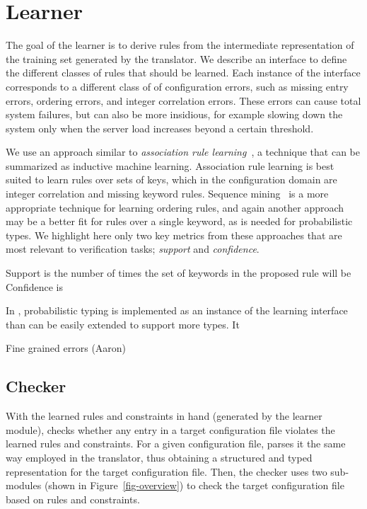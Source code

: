 \section{Learner}
\label{sec-learn}

The goal of the learner is to derive rules from the intermediate representation of the training set generated by the translator.
We describe an interface to define the different classes of rules that should be learned.
Each instance of the interface corresponds to a different class of of configuration errors, such as missing entry errors, ordering errors, and integer correlation errors. 
These errors can cause total system failures, but can also be more insidious, for example slowing down the system only when the server load increases beyond a certain threshold.


We use an approach similar to \textit{association rule learning}~\cite{agrawal1993mining}, a technique that can be summarized as inductive machine learning.
Association rule learning is best suited to learn rules over sets of keys, which in the configuration domain are integer correlation and missing keyword rules.
Sequence mining~\cite{} is a more appropriate technique for learning ordering rules, and again another approach may be a better fit for rules over a single keyword, as is needed for probabilistic types.
We highlight here only two key metrics from these approaches that are most relevant to verification tasks; \textit{support} and \textit{confidence}.

Support is the number of times the set of keywords in the proposed rule will be 
Confidence is 



In \app, probabilistic typing is implemented as an instance of the learning interface than can be easily extended to support more types. 
It 

Fine grained errors (Aaron)

\subsection{Checker}
\label{sec-checker}

With the learned rules and constraints in hand (generated
by the learner module),
\app checks whether any entry in a target configuration file
violates the learned rules and constraints.
For a given configuration file, \app parses it the same
way employed in the translator, thus obtaining a structured
and typed representation for the target configuration file.
Then, the checker uses two sub-modules (shown in 
Figure~\ref{fig-overview}) to check the target
configuration file based on rules and constraints.

